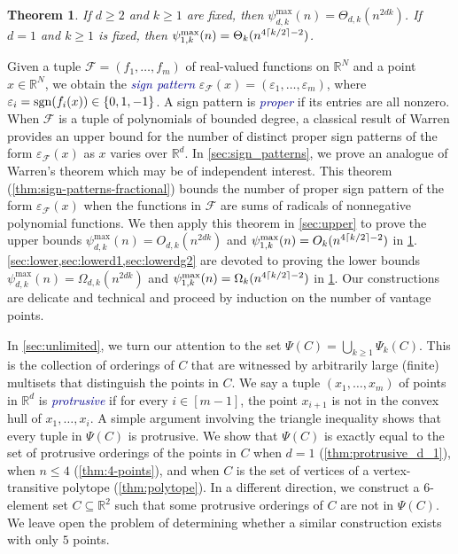 \documentclass[11pt]{amsart}
\newtheorem{theorem}{Theorem}[section]
\theoremstyle{definition}
\DeclarePairedDelimiter{\set}{\{}{\}}
\DeclarePairedDelimiter{\ceil}{\lceil}{\rceil}
\DeclareMathOperator{\sgn}{sgn}
\newcommand{\perm}{\psi^{\mathrm{max}}}
\newcommand{\calf}{\mathcal{F}}
\newcommand{\eps}{\varepsilon}
\newcommand{\RR}{\mathbb{R}}
\newcommand{\dfn}[1]{\textcolor{darkblue}{\emph{#1}}}
\begin{document}
\begin{theorem}\label{thm:main}
If $d \geq 2$ and $k \geq 1$ are fixed, then $\perm_{d,k}(n) = \Theta_{d, k}(n^{2dk})$.  If $d=1$ and $k \geq 1$ is fixed, then $\perm_{1,k}(n)=\Theta_k(n^{4\ceil{k/2}-2})$.
\end{theorem}

Given a tuple $\calf=(f_1, \ldots, f_m)$ of real-valued functions on $\RR^N$ and a point $x \in \RR^N$, we obtain the \dfn{sign pattern} $\eps_{\calf}(x)=(\eps_1, \ldots,\eps_m)$, where $\eps_i=\sgn(f_i(x))\in\set{0,1,-1}$.  A sign pattern is \dfn{proper} if its entries are all nonzero. When $\calf$ is a tuple of polynomials of bounded degree, a classical result of Warren \cite{Warren1968} provides an upper bound for the number of distinct proper sign patterns of the form $\eps_{\calf}(x)$ as $x$ varies over $\RR^d$. In \cref{sec:sign_patterns}, we prove an analogue of Warren's theorem which may be of independent interest. This theorem (\cref{thm:sign-patterns-fractional}) bounds the number of proper sign pattern of the form $\eps_{\calf}(x)$ when the functions in $\calf$ are sums of radicals of nonnegative polynomial functions. We then apply this theorem in \cref{sec:upper} to prove the upper bounds $\perm_{d,k}(n)=O_{d,k}(n^{2dk})$ and $\perm_{1,k}(n)=O_k(n^{4\ceil{k/2}-2})$ in \cref{thm:main}. \cref{sec:lower,sec:lowerd1,sec:lowerdg2} are devoted to proving the lower bounds $\perm_{d,k}(n)=\Omega_{d,k}(n^{2dk})$ and $\perm_{1,k}(n)=\Omega_k(n^{4\ceil{k/2}-2})$ in \cref{thm:main}. Our constructions are delicate and technical and proceed by induction on the number of vantage points. 

In \cref{sec:unlimited}, we turn our attention to the set $\Psi(C)=\bigcup_{k\geq 1}\Psi_k(C)$. This is the collection of orderings of $C$ that are witnessed by arbitrarily large (finite) multisets that distinguish the points in $C$. We say a tuple $(x_1,\ldots,x_m)$ of points in $\RR^d$ is \dfn{protrusive} if for every $i\in[m-1]$, the point $x_{i+1}$ is not in the convex hull of $x_1,\ldots,x_i$. A simple argument involving the triangle inequality shows that every tuple in $\Psi(C)$ is protrusive. We show that $\Psi(C)$ is exactly equal to the set of protrusive orderings of the points in $C$ when $d=1$ (\cref{thm:protrusive_d_1}), when $n\leq 4$ (\cref{thm:4-points}), and when $C$ is the set of vertices of a vertex-transitive polytope (\cref{thm:polytope}). In a different direction, we construct a $6$-element set $C\subseteq\RR^2$ such that some protrusive orderings of $C$ are not in $\Psi(C)$. We leave open the problem of determining whether a similar construction exists with only $5$ points. 
\end{document}
